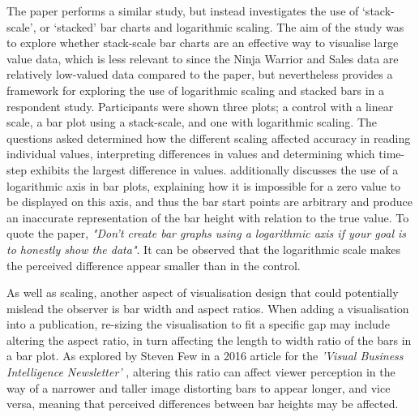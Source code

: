 \documentclass[
  12pt,
]{book}
\begin{document}
The paper \citet{stackscale} performs a similar study, but instead
investigates the use of `stack-scale', or `stacked' bar charts and
logarithmic scaling. The aim of the study was to explore whether
stack-scale bar charts are an effective way to visualise large value
data, which is less relevant to since the Ninja Warrior and Sales data
are relatively low-valued data compared to the paper, but nevertheless
provides a framework for exploring the use of logarithmic scaling and
stacked bars in a respondent study. Participants were shown three plots;
a control with a linear scale, a bar plot using a stack-scale, and one
with logarithmic scaling. The questions asked determined how the
different scaling affected accuracy in reading individual values,
interpreting differences in values and determining which time-step
exhibits the largest difference in values. \citet{logax} additionally
discusses the use of a logarithmic axis in bar plots, explaining how it
is impossible for a zero value to be displayed on this axis, and thus
the bar start points are arbitrary and produce an inaccurate
representation of the bar height with relation to the true value. To
quote the paper,
\textit{"Don’t create bar graphs using a logarithmic axis if your goal is to honestly show the data"}.
It can be observed that the logarithmic scale makes the perceived
difference appear smaller than in the control.

As well as scaling, another aspect of visualisation design that could
potentially mislead the observer is bar width and aspect ratios. When
adding a visualisation into a publication, re-sizing the visualisation
to fit a specific gap may include altering the aspect ratio, in turn
affecting the length to width ratio of the bars in a bar plot. As
explored by Steven Few in a 2016 article for the
\textit{'Visual Business Intelligence Newsletter'} \citep{Few2016},
altering this ratio can affect viewer perception in the way of a
narrower and taller image distorting bars to appear longer, and vice
versa, meaning that perceived differences between bar heights may be
affected.
\end{document}
